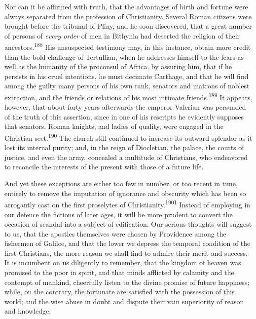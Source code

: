 Nor can it be affirmed with truth, that the advantages of birth
and fortune were always separated from the profession of
Christianity. Several Roman citizens were brought before the
tribunal of Pliny, and he soon discovered, that a great number of
persons of \textit{every order} of men in Bithynia had deserted the
religion of their ancestors.\textsuperscript{188} His unsuspected testimony may,
in this instance, obtain more credit than the bold challenge of
Tertullian, when he addresses himself to the fears as well as the
humanity of the proconsul of Africa, by assuring him, that if he
persists in his cruel intentions, he must decimate Carthage, and
that he will find among the guilty many persons of his own rank,
senators and matrons of noblest extraction, and the friends or
relations of his most intimate friends.\textsuperscript{189} It appears, however,
that about forty years afterwards the emperor Valerian was
persuaded of the truth of this assertion, since in one of his
rescripts he evidently supposes that senators, Roman knights, and
ladies of quality, were engaged in the Christian sect.\textsuperscript{190} The
church still continued to increase its outward splendor as it
lost its internal purity; and, in the reign of Diocletian, the
palace, the courts of justice, and even the army, concealed a
multitude of Christians, who endeavored to reconcile the
interests of the present with those of a future life.




And yet these exceptions are either too few in number, or too
recent in time, entirely to remove the imputation of ignorance
and obscurity which has been so arrogantly cast on the first
proselytes of Christianity.\textsuperscript{1901} Instead of employing in our
defence the fictions of later ages, it will be more prudent to
convert the occasion of scandal into a subject of edification.
Our serious thoughts will suggest to us, that the apostles
themselves were chosen by Providence among the fishermen of
Galilee, and that the lower we depress the temporal condition of
the first Christians, the more reason we shall find to admire
their merit and success. It is incumbent on us diligently to
remember, that the kingdom of heaven was promised to the poor in
spirit, and that minds afflicted by calamity and the contempt of
mankind, cheerfully listen to the divine promise of future
happiness; while, on the contrary, the fortunate are satisfied
with the possession of this world; and the wise abuse in doubt
and dispute their vain superiority of reason and knowledge.

